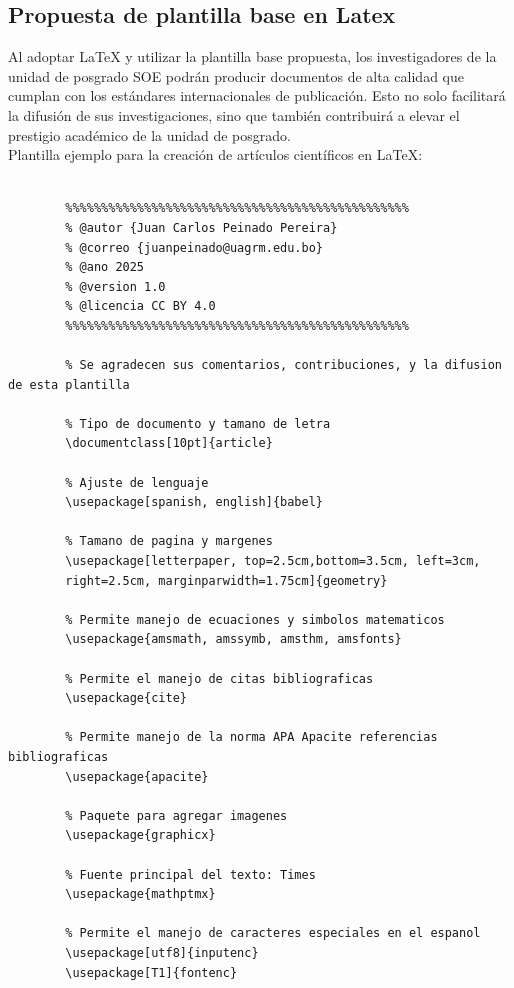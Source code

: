 \documentclass[10pt]{article}
\begin{document}
    \subsection{Propuesta de plantilla base en Latex}
    Al adoptar LaTeX y utilizar la plantilla base propuesta, los investigadores de la unidad de posgrado SOE podrán producir documentos de alta calidad que cumplan con los estándares internacionales de publicación. 
    Esto no solo facilitará la difusión de sus investigaciones, sino que también contribuirá a elevar el prestigio académico de la unidad de posgrado.\\
    Plantilla ejemplo para la creación de artículos científicos en LaTeX:
    \begin{lstlisting}[style=mystyle]
      
        %%%%%%%%%%%%%%%%%%%%%%%%%%%%%%%%%%%%%%%%%%%%%%%%
        % @autor {Juan Carlos Peinado Pereira}
        % @correo {juanpeinado@uagrm.edu.bo}
        % @ano 2025
        % @version 1.0
        % @licencia CC BY 4.0
        %%%%%%%%%%%%%%%%%%%%%%%%%%%%%%%%%%%%%%%%%%%%%%%%
    
        % Se agradecen sus comentarios, contribuciones, y la difusion de esta plantilla
        
        % Tipo de documento y tamano de letra
        \documentclass[10pt]{article}
        
        % Ajuste de lenguaje
        \usepackage[spanish, english]{babel}
        
        % Tamano de pagina y margenes
        \usepackage[letterpaper, top=2.5cm,bottom=3.5cm, left=3cm, 
        right=2.5cm, marginparwidth=1.75cm]{geometry}
        
        % Permite manejo de ecuaciones y simbolos matematicos
        \usepackage{amsmath, amssymb, amsthm, amsfonts}
        
        % Permite el manejo de citas bibliograficas
        \usepackage{cite}
        
        % Permite manejo de la norma APA Apacite referencias bibliograficas
        \usepackage{apacite}
        
        % Paquete para agregar imagenes
        \usepackage{graphicx}
        
        % Fuente principal del texto: Times
        \usepackage{mathptmx}
        
        % Permite el manejo de caracteres especiales en el espanol
        \usepackage[utf8]{inputenc} 
        \usepackage[T1]{fontenc}
        

\end{lstlisting}
\end{document}

